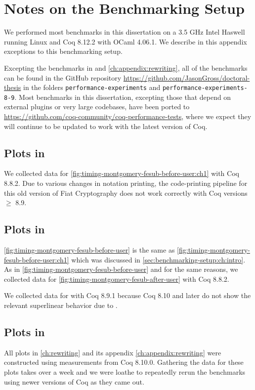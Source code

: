 \chapter{Notes on the Benchmarking Setup}\label{ch:appendix:benchmarking-setup}

We performed most benchmarks in this dissertation on a 3.5 GHz Intel Haswell running Linux and Coq 8.12.2 with OCaml 4.06.1.
We describe in this appendix exceptions to this benchmarking setup.

Excepting the benchmarks in  and \autoref{ch:appendix:rewriting}, all of the benchmarks can be found in the GitHub repository \url{https://github.com/JasonGross/doctoral-thesis} in the folders \texttt{performance-experiments} and \texttt{performance-experiments-8-9}.
Most benchmarks in this dissertation, excepting those that depend on external plugins or very large codebases, have been ported to \url{https://github.com/coq-community/coq-performance-tests}, where we expect they will continue to be updated to work with the latest version of Coq.

\section{Plots in }\label{sec:benchmarking-setup:ch:intro}
We collected data for \autoref{fig:timing-montgomery-fesub-before-user:ch1} with Coq 8.8.2.
Due to various changes in notation printing, the code-printing pipeline for this old version of Fiat Cryptography does not work correctly with Coq versions $\ge$ 8.9.

\section{Plots in }
\autoref{fig:timing-montgomery-fesub-before-user} is the same as \autoref{fig:timing-montgomery-fesub-before-user:ch1} which was discussed in \autoref{sec:benchmarking-setup:ch:intro}.
As in \autoref{fig:timing-montgomery-fesub-before-user} and for the same reasons, we collected data for \autoref{fig:timing-montgomery-fesub-after-user} with Coq 8.8.2.

We collected data for  with Coq 8.9.1 because Coq 8.10 and later do not show the relevant superlinear behavior due to .

\section{Plots in }
All plots in \autoref{ch:rewriting} and its appendix \ref{ch:appendix:rewriting} were constructed using measurements from Coq 8.10.0.
Gathering the data for these plots takes over a week and we were loathe to repeatedly rerun the benchmarks using newer versions of Coq as they came out.
